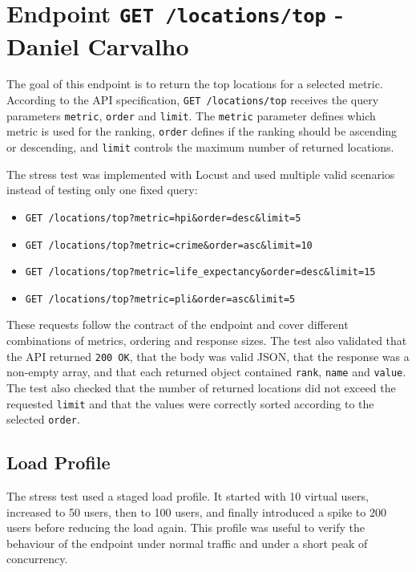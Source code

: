 \section{Endpoint \texttt{GET /locations/top} - Daniel Carvalho}

The goal of this endpoint is to return the top locations for a selected metric. According to the API specification, \texttt{GET /locations/top} receives the query parameters \texttt{metric}, \texttt{order} and \texttt{limit}. The \texttt{metric} parameter defines which metric is used for the ranking, \texttt{order} defines if the ranking should be ascending or descending, and \texttt{limit} controls the maximum number of returned locations.

The stress test was implemented with Locust and used multiple valid scenarios instead of testing only one fixed query:

\begin{itemize}
    \item \texttt{GET /locations/top?metric=hpi\&order=desc\&limit=5}
    \item \texttt{GET /locations/top?metric=crime\&order=asc\&limit=10}
    \item \texttt{GET /locations/top?metric=life\_expectancy\&order=desc\&limit=15}
    \item \texttt{GET /locations/top?metric=pli\&order=asc\&limit=5}
\end{itemize}

These requests follow the contract of the endpoint and cover different combinations of metrics, ordering and response sizes. The test also validated that the API returned \texttt{200 OK}, that the body was valid JSON, that the response was a non-empty array, and that each returned object contained \texttt{rank}, \texttt{name} and \texttt{value}. The test also checked that the number of returned locations did not exceed the requested \texttt{limit} and that the values were correctly sorted according to the selected \texttt{order}.

\subsection{Load Profile}

The stress test used a staged load profile. It started with 10 virtual users, increased to 50 users, then to 100 users, and finally introduced a spike to 200 users before reducing the load again. This profile was useful to verify the behaviour of the endpoint under normal traffic and under a short peak of concurrency.

